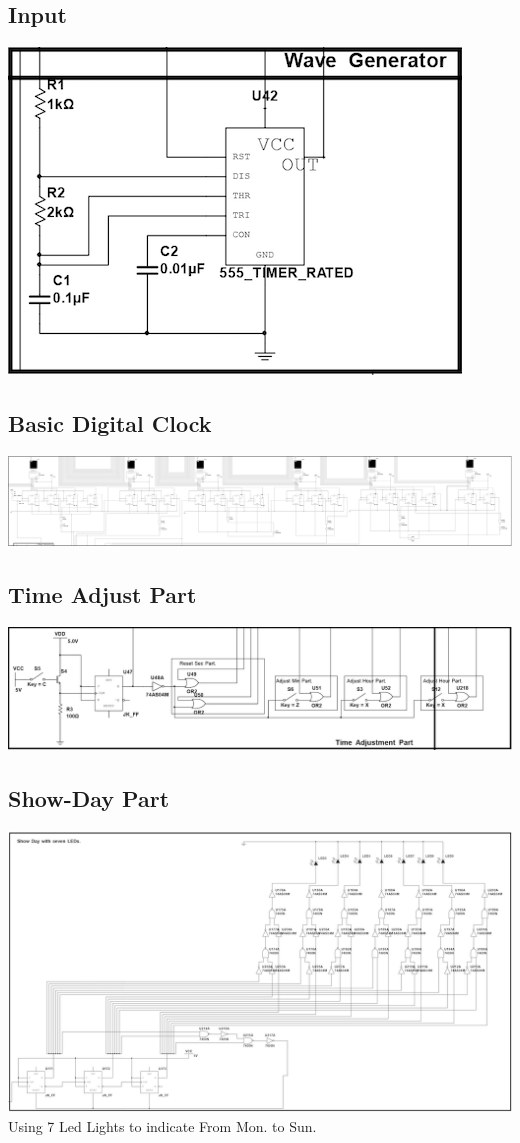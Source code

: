 \documentclass[12pt]{article}
\begin{document}
\subsection{Input}
\includegraphics{Input.png}

\subsection{Basic Digital Clock}
\includegraphics[scale=0.53]{Basic.png}


\subsection{Time Adjust Part}
\includegraphics[scale=0.70]{Time.png}

\subsection{Show-Day Part}
\includegraphics[scale=0.90]{Day.png}
Using 7 Led Lights to indicate From Mon. to Sun.
\frameboxend
\end{document}
